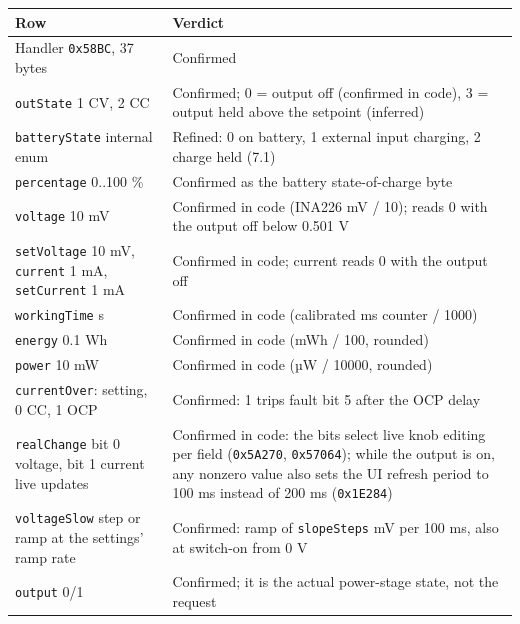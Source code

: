 {\def\LTcaptype{none} %
\begin{longtable}[]{@{}
  >{\raggedright\arraybackslash}p{}
  >{\raggedright\arraybackslash}p{}@{}}
\toprule\noalign{}
\begin{minipage}[b]{\linewidth}\raggedright
Row
\end{minipage} & \begin{minipage}[b]{\linewidth}\raggedright
Verdict
\end{minipage} \\
\midrule\noalign{}
\endhead
\bottomrule\noalign{}
\endlastfoot
Handler \texttt{0x58BC}, 37 bytes & Confirmed \\
\texttt{outState} 1 CV, 2 CC & Confirmed; 0 = output off (confirmed in
code), 3 = output held above the setpoint (inferred) \\
\texttt{batteryState} internal enum & Refined: 0 on battery, 1 external
input charging, 2 charge held (7.1) \\
\texttt{percentage} 0..100 \% & Confirmed as the battery state-of-charge
byte \\
\texttt{voltage} 10 mV & Confirmed in code (INA226 mV / 10); reads 0
with the output off below 0.501 V \\
\texttt{setVoltage} 10 mV, \texttt{current} 1 mA, \texttt{setCurrent} 1
mA & Confirmed in code; current reads 0 with the output off \\
\texttt{workingTime} s & Confirmed in code (calibrated ms counter /
1000) \\
\texttt{energy} 0.1 Wh & Confirmed in code (mWh / 100, rounded) \\
\texttt{power} 10 mW & Confirmed in code (µW / 10000, rounded) \\
\texttt{currentOver}: setting, 0 CC, 1 OCP & Confirmed: 1 trips fault
bit 5 after the OCP delay \\
\texttt{realChange} bit 0 voltage, bit 1 current live updates &
Confirmed in code: the bits select live knob editing per field
(\texttt{0x5A270}, \texttt{0x57064}); while the output is on, any
nonzero value also sets the UI refresh period to 100 ms instead of 200
ms (\texttt{0x1E284}) \\
\texttt{voltageSlow} step or ramp at the settings' ramp rate &
Confirmed: ramp of \texttt{slopeSteps} mV per 100 ms, also at switch-on
from 0 V \\
\texttt{output} 0/1 & Confirmed; it is the actual power-stage state, not
the request \\

\end{longtable}}
